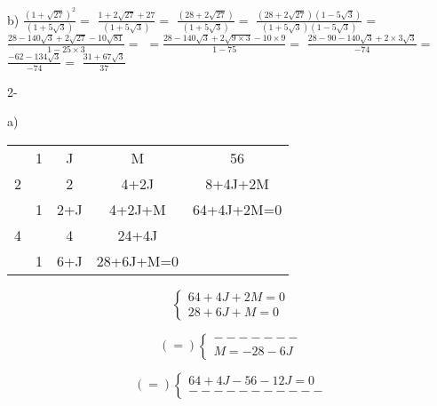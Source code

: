 \documentclass[11pt]{article}
\begin{document}
\vspace{5mm}
b)\hspace{5mm} $\frac{(1+\sqrt{27})^2}{(1+5\sqrt{3})}=$
	$ \frac{1+2\sqrt{27}+27}{(1+5\sqrt{3})}=$
	$ \frac{(28+2\sqrt{27})}{(1+5\sqrt{3})}=$
	$ \frac{(28+2\sqrt{27})(1-5\sqrt{3})}{(1+5\sqrt{3})(1-5\sqrt{3})}=$
	$ \frac{28-140\sqrt{3}+2\sqrt{27}-10\sqrt{81}}{1-25\times3}=$
	$= \frac{28-140\sqrt{3}+2\sqrt{9\times3}-10\times9}{1-75}=$
	$ \frac{28-90-140\sqrt{3}+2\times3\sqrt{3}}{-74}=$
	$ \frac{-62-134\sqrt{3}}{-74}=$
	$ \frac{31+67\sqrt{3}}{37}$

\vspace{5mm}
{\large 2-}

a)

\begin{table}[htbp]
\centering
\label{my-label}
\begin{tabular}{c|cccc}
  & 1 & J                        & M                           & 56         \\
2 &   & 2                        & 4+2J                        & 8+4J+2M    \\ \hline
  & 1 & 2+J                      & \multicolumn{1}{c|}{4+2J+M} & 64+4J+2M=0 \\ \cline{5-5} 
4 &   & 4                        & 24+4J                       &            \\ \cline{1-4}
  & 1 & \multicolumn{1}{c|}{6+J} & 28+6J+M=0                   &            \\ \cline{4-4}
\end{tabular}
\end{table}

\begin{minipage}{0.3\textwidth}
	\[\left\{
		\begin{array}{lr}
    		64+4J+2M=0\\
    		28+6J+M=0
  		\end{array}
	\right.
	\]
\end{minipage}%
\begin{minipage}{0.3\textwidth}
	\[(=)\left\{
		\begin{array}{lr}
    		-------\\
    		M=-28-6J
  		\end{array}
	\right.
	\]					
\end{minipage}
\begin{minipage}{0.3\textwidth}
	\[(=)\left\{
		\begin{array}{lr}
    		64+4J-56-12J=0\\
    		-----------
  		\end{array}
	\right.
	\]			
\end{minipage}
\end{document}
